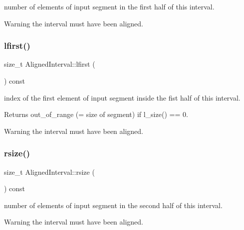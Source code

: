 number of elements of input segment in the first half of this interval. 

\begin{DoxyWarning}{Warning}
the interval must have been aligned. 
\end{DoxyWarning}
\mbox{\label{classAlignedInterval_a85114f9883305f0cf975dbdffff41772}} 
\subsubsection{\texorpdfstring{lfirst()}{lfirst()}}
{\footnotesize\ttfamily size\+\_\+t Aligned\+Interval\+::lfirst (\begin{DoxyParamCaption}{ }\end{DoxyParamCaption}) const\hspace{0.3cm}{\ttfamily [inline]}}



index of the first element of input segment inside the fist half of this interval. 

\begin{DoxyReturn}{Returns}
out\+\_\+of\+\_\+range (= size of segment) if l\+\_\+size() == 0. 
\end{DoxyReturn}
\begin{DoxyWarning}{Warning}
the interval must have been aligned. 
\end{DoxyWarning}
\mbox{\label{classAlignedInterval_abf3b5daa25e0d74999e5a2d1d04cd185}} 
\subsubsection{\texorpdfstring{rsize()}{rsize()}}
{\footnotesize\ttfamily size\+\_\+t Aligned\+Interval\+::rsize (\begin{DoxyParamCaption}{ }\end{DoxyParamCaption}) const\hspace{0.3cm}{\ttfamily [inline]}}



number of elements of input segment in the second half of this interval. 

\begin{DoxyWarning}{Warning}
the interval must have been aligned. 
\end{DoxyWarning}
\mbox{\label{classAlignedInterval_aa7c4a66d5fd0ff2dc29a4fea57f0c561}} 
